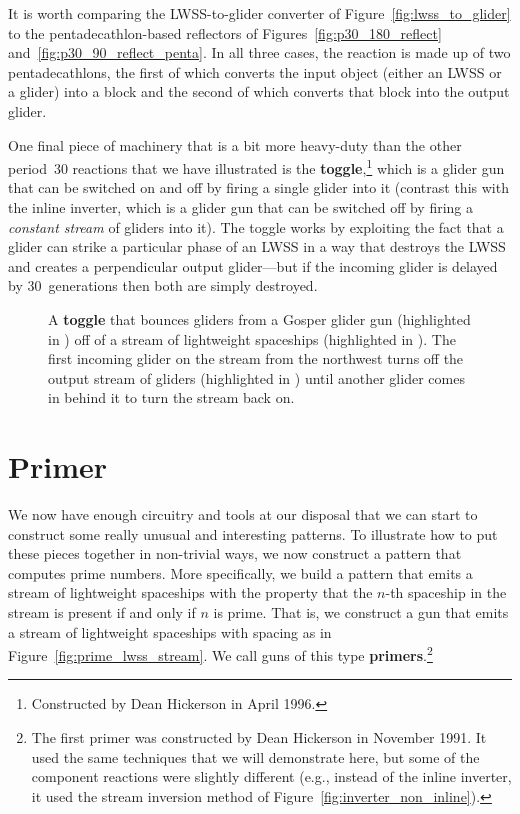 It is worth comparing the LWSS-to-glider converter of Figure~\ref{fig:lwss_to_glider} to the pentadecathlon-based reflectors of Figures~\ref{fig:p30_180_reflect} and~\ref{fig:p30_90_reflect_penta}. In all three cases, the reaction is made up of two pentadecathlons, the first of which converts the input object (either an LWSS or a glider) into a block and the second of which converts that block into the output glider.

One final piece of machinery that is a bit more heavy-duty than the other period~$30$ reactions that we have illustrated is the \textbf{toggle},\footnote{Constructed by Dean Hickerson in April 1996.} which is a glider gun that can be switched on and off by firing a single glider into it (contrast this with the inline inverter, which is a glider gun that can be switched off by firing a \emph{constant stream} of gliders into it). The toggle works by exploiting the fact that a glider can strike a particular phase of an LWSS in a way that destroys the LWSS and creates a perpendicular output glider---but if the incoming glider is delayed by $30$~generations then both are simply destroyed.

\begin{figure}[!htb]
	\centering
	\caption{A \textbf{toggle} that bounces gliders from a Gosper glider gun (highlighted in ) off of a stream of lightweight spaceships (highlighted in ). The first incoming glider on the  stream from the northwest turns off the output stream of gliders (highlighted in ) until another glider comes in behind it to turn the stream back on.}
	\label{fig:toggle}
\end{figure}


\section{Primer}\label{sec:primer}

We now have enough circuitry and tools at our disposal that we can start to construct some really unusual and interesting patterns. To illustrate how to put these pieces together in non-trivial ways, we now construct a pattern that computes prime numbers. More specifically, we build a pattern that emits a stream of lightweight spaceships with the property that the $n$-th spaceship in the stream is present if and only if $n$ is prime. That is, we construct a gun that emits a stream of lightweight spaceships with spacing as in Figure~\ref{fig:prime_lwss_stream}. We call guns of this type \textbf{primers}.\footnote{The first primer was constructed by Dean Hickerson in November 1991. It used the same techniques that we will demonstrate here, but some of the component reactions were slightly different (e.g., instead of the inline inverter, it used the stream inversion method of Figure~\ref{fig:inverter_non_inline}).}

